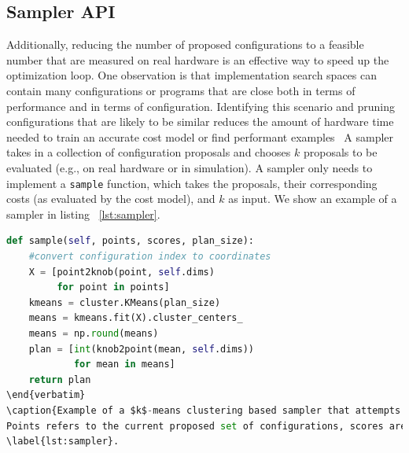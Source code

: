 \subsection{Sampler API}
Additionally, reducing the number of proposed configurations to a feasible number that are measured on real hardware is an effective way to speed up the optimization loop.
One observation is that implementation search spaces can contain many configurations or programs that are close both in terms of performance and in terms of configuration.
Identifying this scenario and pruning configurations that are likely to be similar reduces the amount of hardware time needed to train an accurate cost model or find performant examples~\cite{DBLP:journals/corr/abs-1905-12799}
A sampler takes in a collection of configuration proposals and chooses $k$ proposals to be evaluated (e.g., on real hardware or in simulation).
A sampler only needs to implement a \texttt{sample} function, which takes the proposals, their corresponding costs (as evaluated by the cost model), and $k$ as input.
We show an example of a sampler in listing ~\autoref{lst:sampler}.

\begin{lstlisting}[language=Python]
def sample(self, points, scores, plan_size):
    #convert configuration index to coordinates
    X = [point2knob(point, self.dims)
         for point in points]
    kmeans = cluster.KMeans(plan_size)
    means = kmeans.fit(X).cluster_centers_
    means = np.round(means)
    plan = [int(knob2point(mean, self.dims))
            for mean in means]
    return plan
\end{verbatim}
\caption{Example of a $k$-means clustering based sampler that attempts to achieve sample diversity.
Points refers to the current proposed set of configurations, scores are their corresponding scores as given by a cost model, and the plan size is the number of points (configurations) that should be selected for measurement.}
\label{lst:sampler}.
\end{lstlisting}




%

